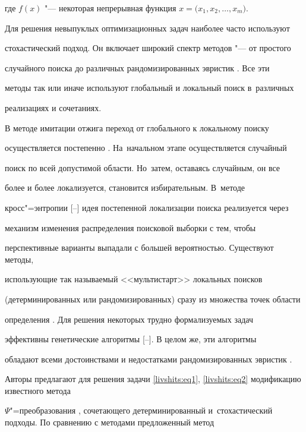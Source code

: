 где $f(x)$ "--- некоторая непрерывная функция $x=\big(x_1,x_2 ,\ldots,x_m \big)$.



Для решения невыпуклых оптимизационных задач наиболее часто используют

стохастический подход. Он включает широкий спектр методов "--- от простого

случайного поиска до различных рандомизированных эвристик \cite{livsh:bib1,livsh:bib2}. Все эти

методы так или иначе используют глобальный и локальный поиск в~различных

реализациях и сочетаниях.



В методе имитации отжига переход от глобального к локальному поиску

осуществляется постепенно \cite{livsh:bib3,livsh:bib4}. На~начальном этапе осуществляется случайный

поиск по всей допустимой области. Но~затем, оставаясь случайным, он все

более и более локализуется, становится избирательным. В~методе

кросс"=энтропии [--] идея постепенной локализации поиска реализуется через

механизм изменения распределения поисковой выборки с тем, чтобы

перспективные варианты выпадали с большей вероятностью. Существуют методы,

использующие так называемый <<мультистарт>> локальных поисков

(детерминированных или рандомизированных) сразу из множества точек области

определения \cite{livsh:bib8,livsh:bib9}. Для решения некоторых трудно формализуемых задач

эффективны генетические алгоритмы [--]. В целом же, эти алгоритмы

обладают всеми достоинствами и недостатками рандомизированных эвристик \cite{livsh:bib12}.



Авторы предлагают для решения задачи \eqref{livshits:eq1}, \eqref{livshits:eq2} модификацию известного метода

$\Psi$"=преобразования \cite{livsh:bib14,livsh:bib15}, сочетающего детерминированный и~стохастический подходы. По сравнению с методами \cite{livsh:bib1,livsh:bib12} предложенный метод

